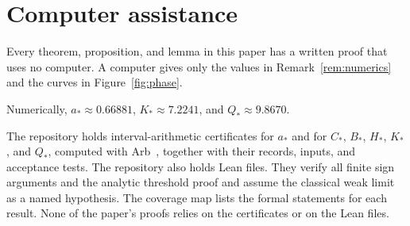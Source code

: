 \section{Computer assistance}\label{sec:verify}

Every theorem, proposition, and lemma in this paper has a written proof
that uses no computer. A computer gives only the values in
Remark~\ref{rem:numerics} and the curves in Figure~\ref{fig:phase}.

\begin{remark}\label{rem:numerics}
Numerically, $a_*\approx0.66881$, $K_*\approx7.2241$, and
$Q_*\approx9.8670$.
\end{remark}
 The repository holds interval-arithmetic
certificates for $a_*$ and for $C_*$, $B_*$, $H_*$, $K_*$, and $Q_*$,
computed with Arb~\cite{johansson2017}, together with their records,
inputs, and acceptance tests. The repository also holds Lean files.
They verify all finite sign arguments and the analytic threshold proof
and assume the classical weak limit as a named hypothesis. The
coverage map lists the formal statements for each result. None of the
paper's proofs relies on the certificates or on the Lean files.
